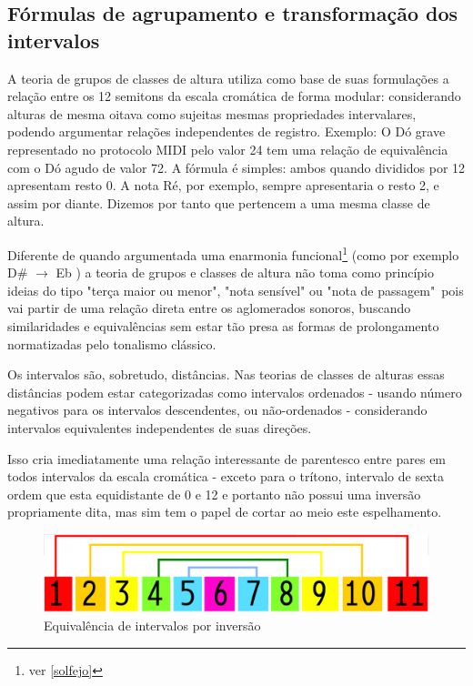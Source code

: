 \documentclass[
	12pt,				%
	openright,			%
	twoside,			%
	a4paper,			%
	english,			%
	french,				%
	spanish,			%
	brazil				%
	]{abntex2}
\begin{document}
\begin{apendicesenv}

\partapendices

\chapter{Fórmulas de agrupamento e transformação dos intervalos}

A teoria de grupos de classes de altura utiliza como base de suas formulações a relação entre os 12 semitons da escala cromática de forma modular: considerando alturas de mesma oitava como sujeitas mesmas propriedades intervalares, podendo argumentar relações independentes de registro. Exemplo: O Dó grave representado no protocolo MIDI pelo valor 24 tem uma relação de equivalência com o Dó agudo de valor 72. A fórmula é simples: ambos quando divididos por 12 apresentam resto 0. A nota Ré, por exemplo, sempre apresentaria o resto 2, e assim por diante. Dizemos por tanto que pertencem a uma mesma classe de altura.

Diferente de quando argumentada uma enarmonia funcional\footnote{ver \autoref{solfejo} } (como por exemplo D\# $\to$ Eb ) a teoria de grupos e classes de altura não toma como princípio ideias do tipo "terça maior ou menor", "nota sensível" ou "nota de passagem"\ pois vai partir de uma relação direta entre os aglomerados sonoros, buscando similaridades e equivalências sem estar tão presa as formas de prolongamento normatizadas pelo tonalismo clássico. \cite{lerdahl1989atonal,straus1987problem}

Os intervalos são, sobretudo, distâncias. Nas teorias de classes de alturas essas distâncias podem estar categorizadas como intervalos ordenados - usando número negativos para os intervalos descendentes, ou não-ordenados - considerando intervalos equivalentes independentes de suas direções.\cite[p. 6]{straus2004}

Isso cria imediatamente uma relação interessante de parentesco entre pares em todos intervalos da escala cromática - exceto para o trítono, intervalo de sexta ordem que esta equidistante de 0 e 12 e portanto não possui uma inversão propriamente dita, mas sim tem o papel de cortar ao meio este espelhamento.

\begin{figure}[!h]
	\caption{\label{fig_grafico}Equivalência de intervalos por inversão }
	\begin{center}
	    \includegraphics[scale=0.3]{algo/equivalencia_inversa.png}
	\end{center}
\end{figure}



\end{apendicesenv}
\end{document}
